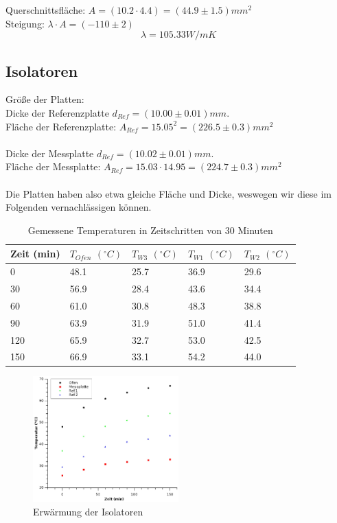 \documentclass[12pt,a4paper,twopage]{article}
\begin{document}
Querschnittsfläche: $A=(10.2 \cdot 4.4)=(44.9 \pm 1.5)mm^2$\\
Steigung: $\lambda \cdot A = (-110 \pm 2)$\\
$$\boxed{\lambda=105.33 W/m K}$$

\subsection{Isolatoren}
Größe der Platten:\\
Dicke der Referenzplatte $d_{Ref}=(10.00 \pm 0.01)mm$.\\
Fläche der Referenzplatte: $A_{Ref}=15.05^2=(226.5 \pm 0.3)mm^2$\\
\\
Dicke der Messplatte $d_{Ref}=(10.02 \pm 0.01)mm$.\\
Fläche der Messplatte: $A_{Ref}=15.03 \cdot 14.95=(224.7 \pm 0.3)mm^2$\\
\\
Die Platten haben also etwa gleiche Fläche und Dicke, weswegen wir diese im Folgenden vernachlässigen können.\\

\begin{table}
\begin{center}
\begin{tabular}{|l|l|l|l|l|}
\hline
Zeit (min) & $T_{Ofen}$ $(^\circ C)$ & $T_{W3}$ $(^\circ C)
$& $T_{W1}$ $(^\circ C)$ & $T_{W2}$ $(^\circ C)$\\
\hline
0 & 48.1 & 25.7 & 36.9 & 29.6\\
30 & 56.9 & 28.4 & 43.6 & 34.4\\
60 & 61.0 & 30.8 & 48.3 & 38.8\\
90 & 63.9 & 31.9 & 51.0 & 41.4\\
120 & 65.9 & 32.7 & 53.0 & 42.5\\
150 & 66.9 & 33.1 & 54.2 & 44.0\\
\hline
\end{tabular}
\caption{Gemessene Temperaturen in Zeitschritten von 30 Minuten}
\end{center}
\end{table}

\begin{figure}
\begin{center}
\includegraphics[width=0.5\textwidth]{isol.eps}
\caption{Erwärmung der Isolatoren}
\end{center}
\end{figure}
\end{document}
